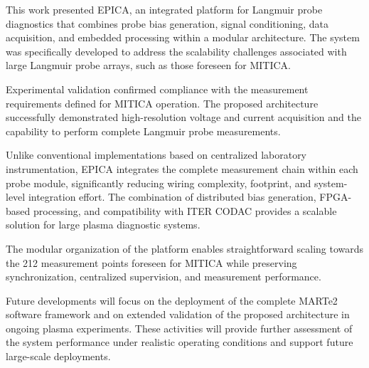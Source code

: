 This work presented EPICA, an integrated platform for Langmuir probe diagnostics that combines probe bias generation, signal conditioning, data acquisition, and embedded processing within a modular architecture. The system was specifically developed to address the scalability challenges associated with large Langmuir probe arrays, such as those foreseen for MITICA.

Experimental validation confirmed compliance with the measurement requirements defined for MITICA operation. The proposed architecture successfully demonstrated high-resolution voltage and current acquisition and the capability to perform complete Langmuir probe measurements.

Unlike conventional implementations based on centralized laboratory instrumentation, EPICA integrates the complete measurement chain within each probe module, significantly reducing wiring complexity, footprint, and system-level integration effort. The combination of distributed bias generation, FPGA-based processing, and compatibility with ITER CODAC provides a scalable solution for large plasma diagnostic systems.

The modular organization of the platform enables straightforward scaling towards the 212 measurement points foreseen for MITICA while preserving synchronization, centralized supervision, and measurement performance.

Future developments will focus on the deployment of the complete MARTe2 software framework and on extended validation of the proposed architecture in ongoing plasma experiments. These activities will provide further assessment of the system performance under realistic operating conditions and support future large-scale deployments.